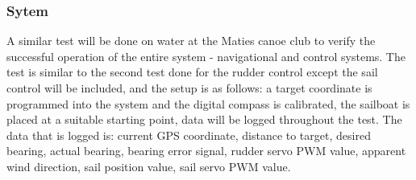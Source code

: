 \subsubsection{Sytem}
A similar test will be done on water at the Maties canoe club to verify the successful operation of the entire system - navigational and control systems. The test
is similar to the second test done for the rudder control except the sail control will be included, and the setup is as follows: a target coordinate is 
programmed into the system and the digital compass is calibrated, the sailboat is placed at a suitable starting point, data will be logged throughout the test. 
The data that is logged is: current GPS coordinate, distance to target, desired bearing, actual bearing, bearing error signal, rudder servo PWM value, apparent 
wind direction, sail position value, sail servo PWM value.






